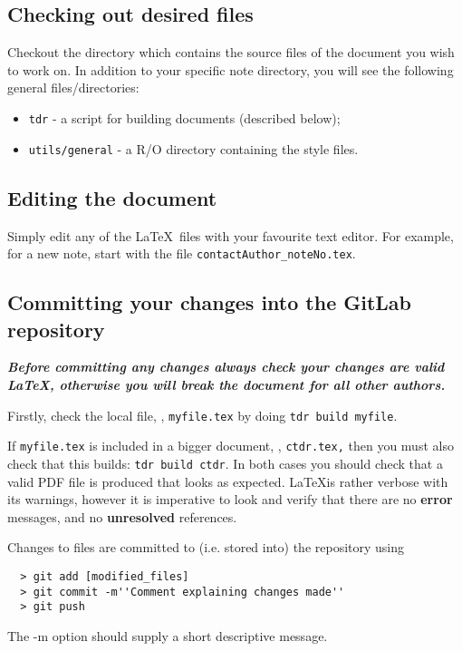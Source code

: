 \subsection{Checking out desired files}

Checkout the directory which contains the source files of
the document you wish to work on.
In addition to your specific note directory, you will see the
following general files/directories:
\begin{itemize}
  \item \texttt{tdr}     - a script for building documents (described below);
  \item \texttt{utils/general} - a R/O directory containing the style files.
\end{itemize}
%


\subsection{Editing the document}
%
Simply edit any of the \LaTeX\ files with your favourite text editor.
For example, for a new note, start with the
file \texttt{contactAuthor\_noteNo.tex}.



\subsection{Committing your changes into the GitLab repository}

\textbf{\emph{Before committing any changes always check your changes are valid \LaTeX,
otherwise you will break the document for all other authors.}}

Firstly, check the local file, \eg, \texttt{myfile.tex} by doing  \texttt{tdr build myfile}.

If \texttt{myfile.tex} is included in a bigger document, \eg, \texttt{ctdr.tex,}
then you must also check that this builds: \texttt{tdr build ctdr}.
In both cases you should check that a valid PDF file is produced that
looks as expected.
\LaTeX is rather verbose with its warnings, however it is imperative to
look and  verify that there are no \textbf{error} messages, and no  \textbf{unresolved} references.


Changes to files are committed to (i.e. stored into)  the repository using
%
\vspace*{-2.5ex}\begin{verbatim}
  > git add [modified_files]
  > git commit -m''Comment explaining changes made''
  > git push
\end{verbatim}
The -m option should supply a short descriptive
message.

